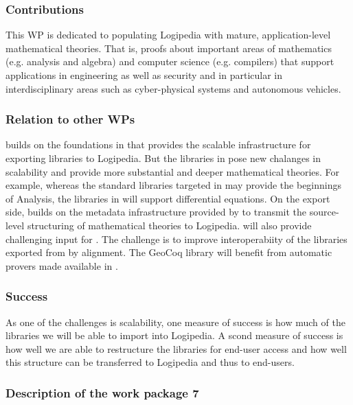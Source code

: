 \subsubsection*{Contributions}

This WP is dedicated to populating Logipedia with mature,
application-level mathematical theories. That is, proofs about
important areas of mathematics (e.g. analysis and algebra) and
computer science (e.g. compilers) that support applications in
engineering as well as security and in particular in interdisciplinary
areas such as cyber-physical systems and autonomous vehicles.

\subsubsection*{Relation to other WPs}


 builds on the foundations in 
that provides the scalable infrastructure for exporting libraries to
Logipedia. But the libraries in  pose new chalanges
in scalability and provide more substantial and deeper mathematical
theories. For example, whereas the standard libraries targeted in
 may provide the beginnings of Analysis, the
libraries in  will support differential equations. On
the export side,  builds on the metadata
infrastructure provided by  to transmit the
source-level structuring of mathematical theories to Logipedia.
 will also provide challenging input for
. The challenge is to improve interoperabiity of the
libraries exported from  by alignment.
The GeoCoq library will benefit from automatic provers made
available in .

\subsubsection*{Success}

As one of the challenges is scalability, one measure of success is how
much of the libraries we will be able to import into Logipedia. A
scond measure of success is how well we are able to restructure the
libraries for end-user access and how well this structure can be
transferred to Logipedia and thus to end-users.


\subsubsection{Description of the work package 7}

